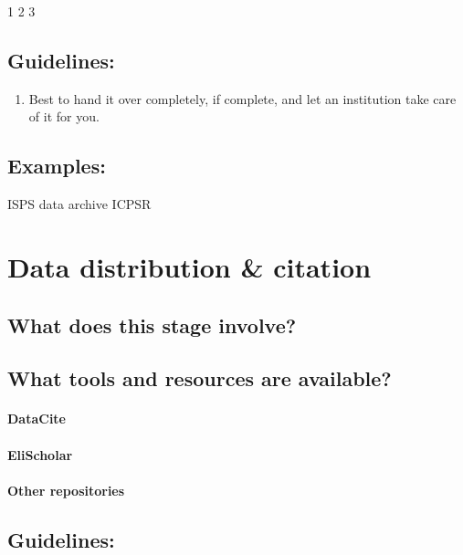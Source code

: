 \documentclass{tufte-handout}
\begin{document}
1 2 3

\subsection{Guidelines:}\label{guidelines-2}

\begin{enumerate}
\def\labelenumi{\arabic{enumi}.}
\itemsep1pt\parskip0pt
\item
  Best to hand it over completely, if complete, and let an institution
  take care of it for you.
\end{enumerate}

\subsection{Examples:}\label{examples}

ISPS data archive ICPSR

\section{Data distribution \&
citation}\label{data-distribution-citation}

\subsection{What does this stage
involve?}\label{what-does-this-stage-involve-4}

\subsection{What tools and resources are
available?}\label{what-tools-and-resources-are-available-4}

\paragraph{DataCite}\label{datacite}

\paragraph{EliScholar}\label{elischolar}

\paragraph{Other repositories}\label{other-repositories}

\subsection{Guidelines:}\label{guidelines-3}
\end{document}

